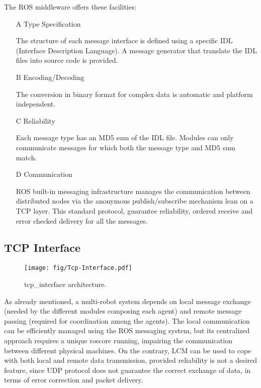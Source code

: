 The ROS middleware offers these facilities:
	\begin{itemize}
	\item[A] Type Specification
		
	The structure of each message interface is defined using a specific IDL (Interface Description Language). A message generator that translate the IDL files into source code is provided.
	
	\item[B] Encoding/Decoding
		
    The conversion in binary format for complex data is automatic and platform independent.
		
		
	\item[C] Reliability
	
	Each message type has an MD5 sum of the IDL file. Modules can only communicate messages for which both the message type and MD5 sum match.

	\item[D] Communication

	ROS built-in messaging infrastructure manages the communication between distributed nodes via the anonymous publish/subscribe mechanism lean on a TCP layer. This standard protocol, guarantee reliability, ordered receive and error checked delivery for all the messages.
	
	\end{itemize}
	
	
 

\subsection{TCP Interface}

\begin{figure}
\centering
\texttt{[image: fig/Tcp-Interface.pdf]}\caption{tcp\_interface architecture.}
\label{fig:tcp_interface}
\end{figure}


As already mentioned, a multi-robot system depends on local message exchange (needed by the different modules composing each agent) and remote message passing (required for coordination among the agents). The local communication can be efficiently managed using the ROS messaging system, but its centralized approach requires a unique roscore running, impairing the communication between different physical machines.
On the contrary, LCM can be used to cope with both local and remote data transmission, provided reliability is not a desired feature, since UDP protocol does not guarantee the correct exchange of data, in terms of error correction and packet delivery.

